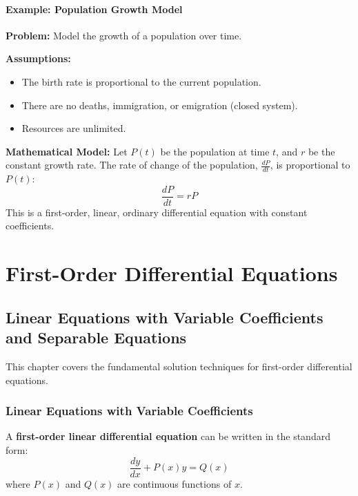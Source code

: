 \documentclass[12pt, letterpaper]{book}
\begin{document}
\subsection{Example: Population Growth Model}
\label{ssec:example_population_growth}
\textbf{Problem:} Model the growth of a population over time.

\textbf{Assumptions:}
\begin{itemize}
    \item The birth rate is proportional to the current population.
    \item There are no deaths, immigration, or emigration (closed system).
    \item Resources are unlimited.
\end{itemize}

\textbf{Mathematical Model:}
Let $P(t)$ be the population at time $t$, and $r$ be the constant growth rate.
The rate of change of the population, $\frac{dP}{dt}$, is proportional to $P(t)$:
\begin{equation}
    \frac{dP}{dt} = rP \label{eq:population_growth}
\end{equation}
This is a first-order, linear, ordinary differential equation with constant coefficients.

\part{First-Order Differential Equations}
\label{part:first_order_de}

\chapter{Linear Equations with Variable Coefficients and Separable Equations}
\label{chap:session_2}

This chapter covers the fundamental solution techniques for first-order differential equations.

\section{Linear Equations with Variable Coefficients}
\label{sec:linear_variable_coeffs}

A \textbf{first-order linear differential equation} can be written in the standard form:
\begin{equation}
    \frac{dy}{dx} + P(x)y = Q(x)
    \label{eq:book_linear_de_standard_form}
\end{equation}
where $P(x)$ and $Q(x)$ are continuous functions of $x$.
\end{document}
